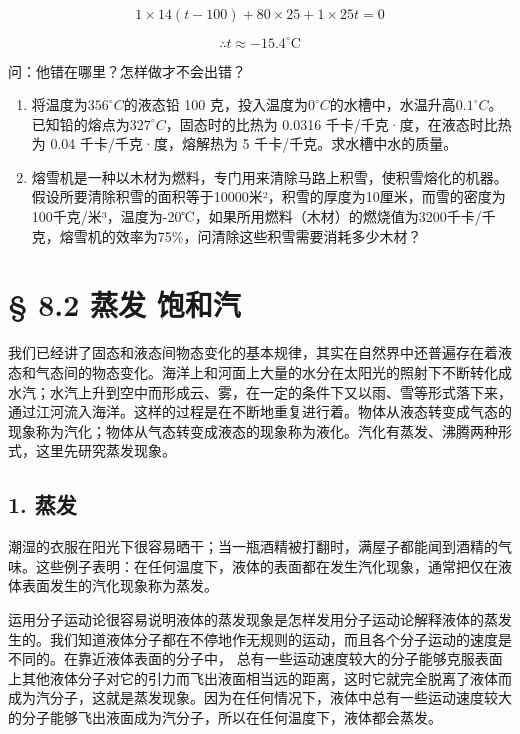 \[
1\times14(t-100)+80\times25+1\times25t=0
\]

\[
\therefore t \approx - 15.4 ^ {\circ} \mathrm{C}
\]

问：他错在哪里？怎样做才不会出错？

\begin{enumerate}
\def\labelenumi{\arabic{enumi}.}
\setcounter{enumi}{10}
\item
  将温度为\(356^{\circ}C\)的液态铅 100
  克，投入温度为\(0^{\circ}C\)的水槽中，水温升高\(0.1^{\circ}C\)。已知铅的熔点为\(327^{\circ}C\)，固态时的比热为
  0.0316 千卡/千克·度，在液态时比热为 0.04 千卡/千克·度，熔解热为 5
  千卡/千克。求水槽中水的质量。
\item
  熔雪机是一种以木材为燃料，专门用来清除马路上积雪，使积雪熔化的机器。假设所要清除积雪的面积等于10000米²，积雪的厚度为10厘米，而雪的密度为100千克/米³，温度为-20℃，如果所用燃料（木材）的燃烧值为3200千卡/千克，熔雪机的效率为75\%，问清除这些积雪需要消耗多少木材？
\end{enumerate}

\section{§ 8.2 蒸发 饱和汽}\label{ux84b8ux53d1-ux9971ux548cux6c7d}

我们已经讲了固态和液态间物态变化的基本规律，其实在自然界中还普遍存在着液态和气态间的物态变化。海洋上和河面上大量的水分在太阳光的照射下不断转化成水汽；水汽上升到空中而形成云、雾，在一定的条件下又以雨、雪等形式落下来，通过江河流入海洋。这样的过程是在不断地重复进行着。物体从液态转变成气态的现象称为汽化；物体从气态转变成液态的现象称为液化。汽化有蒸发、沸腾两种形式，这里先研究蒸发现象。

\subsection{1. 蒸发}\label{ux84b8ux53d1}

潮湿的衣服在阳光下很容易晒干；当一瓶酒精被打翻时，满屋子都能闻到酒精的气味。这些例子表明：在任何温度下，液体的表面都在发生汽化现象，通常把仅在液体表面发生的汽化现象称为蒸发。

运用分子运动论很容易说明液体的蒸发现象是怎样发用分子运动论解释液体的蒸发生的。我们知道液体分子都在不停地作无规则的运动，而且各个分子运动的速度是不同的。在靠近液体表面的分子中，
总有一些运动速度较大的分子能够克服表面上其他液体分子对它的引力而飞出液面相当远的距离，这时它就完全脱离了液体而成为汽分子，这就是蒸发现象。因为在任何情况下，液体中总有一些运动速度较大的分子能够飞出液面成为汽分子，所以在任何温度下，液体都会蒸发。

